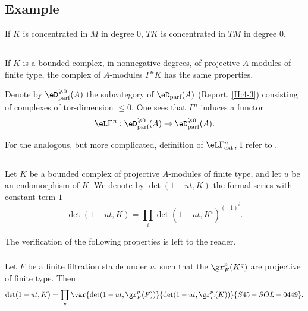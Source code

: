 \subsection{Example}\label{III:1-5}

If $K$ is concentrated in $M$ in degree $0$, $T K$ is concentrated in $T M$
in degree $0$.






\subsection{}\label{III:1-6}

If $K$ is a bounded complex, in nonnegative degrees, of projective
$A$-modules of finite type, the complex of $A$-modules $\Gamma^n K$ has the
same properties.

Denote by $\eD_\text{parf}^{\geqslant 0}(A)$ the subcategory of
$\eD_\text{parf}(A)$ (Report, \ref{II:4-3}) consisting of complexes of
tor-dimension $\leqslant 0$. One sees that $\Gamma^n$ induces a functor
\[
  \eL\Gamma^n : \eD_\text{parf}^{\geqslant 0}(A) \to \eD_\text{parf}^{\geqslant 0}(A) \text{.}
\]

For the analogous, but more complicated, definition of
$\eL\Gamma_\text{ext}^n$, I refer to \cite[XVII 5.5.14]{sga4}.






\subsection{}\label{III:1-7}

Let $K$ be a bounded complex of projective $A$-modules of finite type, and let
$u$ be an endomorphism of $K$. We denote by $\det(1-u t,K)$ the formal series
with constant term $1$
\[
  \det(1-u t,K) = \prod_i \det(1-u t,K^i)^{(-1)^i} \text{.}
\]

The verification of the following properties is left to the reader.


\subsubsection{}\label{III:1-7-1}

Let $F$ be a finite filtration stable under $u$, such that the
$\gr_F^p(K^q)$ are projective of finite type. Then
\[
  \det(1-u t,K) = \prod_p \var{\det(1-u t,\gr_F^p(F))}{\det(1-u t,\gr_F^p(K))}{S45-SOL-0449} \text{.}
\]


